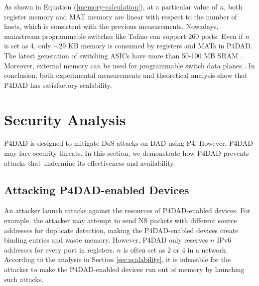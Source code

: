 \documentclass[journal]{IEEEtran}
\begin{document}
            As shown in Equation (\ref{memory-calculation}), at a particular value of $n$, both register memory and MAT memory are linear with respect to the number of hosts, which is consistent with the previous measurements.
            Nowadays, mainstream programmable switches like Tofino \cite{tofino} can support 260 ports. Even if $n$ is set as 4, only $\sim$29 KB memory is consumed by registers and MATs in P4DAD.
            The latest generation of switching ASICs have more than 50-100 MB SRAM \cite{DBLP:conf/sigcomm/MiaoZKLY17}.
            Moreover, external memory can be used for programmable switch data planes \cite{DBLP:conf/hotnets/KimZKLS18}.
            In conclusion, both experimental measurements and theoretical analysis show that P4DAD has satisfactory scalability.
            



\section{Security Analysis}\label{sec:security analysis}
    P4DAD is designed to mitigate DoS attacks on DAD using P4. However, P4DAD may face security threats. In this section, we demonstrate how P4DAD prevents attacks that undermine its effectiveness and availability. 

    \subsection{Attacking P4DAD-enabled Devices}
        An attacker launch attacks against the resources of P4DAD-enabled devices. For example, the attacker may attempt to send NS packets with different source addresses for duplicate detection, making the P4DAD-enabled devices create binding entries and waste memory. However, P4DAD only reserves $n$ IPv6 addresses for every port in registers. $n$ is often set as 2 or 4  in a network. According to the analysis in Section \ref{sec:scalability}, it is infeasible for the attacker to make the P4DAD-enabled devices run out of memory by launching such attacks.
\end{document}

